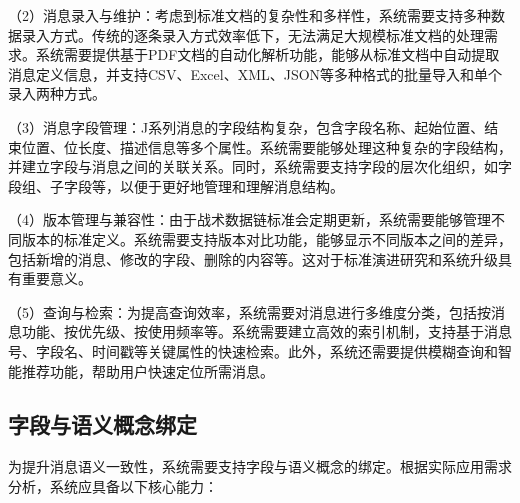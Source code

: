 \begin{table}[!htb]
    \caption{系统支持的标准和协议}
    \label{table_supported_standards}
    \centering
\end{table}

（2）消息录入与维护：考虑到标准文档的复杂性和多样性，系统需要支持多种数据录入方式。传统的逐条录入方式效率低下，无法满足大规模标准文档的处理需求。系统需要提供基于PDF文档的自动化解析功能，能够从标准文档中自动提取消息定义信息，并支持CSV、Excel、XML、JSON等多种格式的批量导入和单个录入两种方式。

（3）消息字段管理：J系列消息的字段结构复杂，包含字段名称、起始位置、结束位置、位长度、描述信息等多个属性。系统需要能够处理这种复杂的字段结构，并建立字段与消息之间的关联关系。同时，系统需要支持字段的层次化组织，如字段组、子字段等，以便于更好地管理和理解消息结构。

（4）版本管理与兼容性：由于战术数据链标准会定期更新，系统需要能够管理不同版本的标准定义。系统需要支持版本对比功能，能够显示不同版本之间的差异，包括新增的消息、修改的字段、删除的内容等。这对于标准演进研究和系统升级具有重要意义。

（5）查询与检索：为提高查询效率，系统需要对消息进行多维度分类，包括按消息功能、按优先级、按使用频率等。系统需要建立高效的索引机制，支持基于消息号、字段名、时间戳等关键属性的快速检索。此外，系统还需要提供模糊查询和智能推荐功能，帮助用户快速定位所需消息。


\subsection{字段与语义概念绑定}
为提升消息语义一致性，系统需要支持字段与语义概念的绑定\cite{Chelton_Link16_Antennas_2022}。根据实际应用需求分析，系统应具备以下核心能力：

